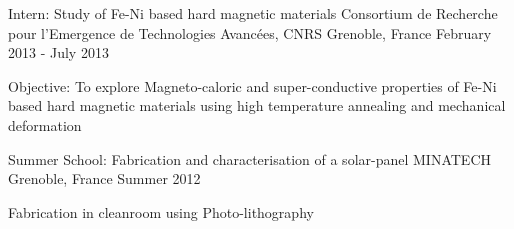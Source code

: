 \begin{cventries}
\cventry
{Intern: Study of Fe-Ni based hard magnetic materials}
{Consortium de Recherche pour l'Emergence de Technologies Avancées, CNRS}
{Grenoble, France}
{February 2013 - July 2013}
{%
\begin{cvitems}
\item {Objective: To explore Magneto-caloric and super-conductive properties of Fe-Ni based hard magnetic materials using high temperature annealing and mechanical deformation}
\end{cvitems} 
}

\cventry
{Summer School: Fabrication and characterisation of a solar-panel}
{MINATECH}
{Grenoble, France}
{Summer 2012}
{%
\begin{cvitems}
\item {Fabrication in cleanroom using Photo-lithography}
\end{cvitems} 
}

\end{cventries}
